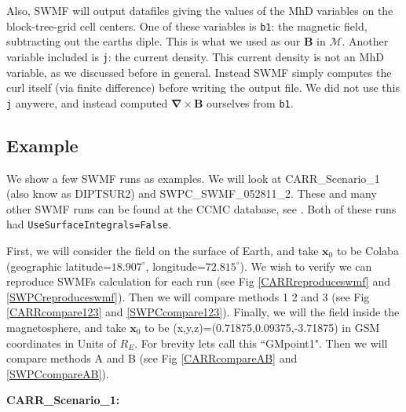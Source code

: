 \documentclass{article}
\newcommand\B{\mathbf{B}}
\newcommand\x{\mathbf{x}}
\newcommand\M{\mathcal{M}}
\newcommand\curl[1]{\boldsymbol{\nabla} \times #1}
\begin{document}
Also, SWMF will output datafiles giving the values of the MhD variables on the block-tree-grid cell centers.
One of these variables is \texttt{b1}: the magnetic field, subtracting out the earths diple.
This is what we used as our $\B$ in $\M$.
Another variable included is \texttt{j}: the current density.
This current density is not an MhD variable, as we discussed before in general.
Instead SWMF simply computes the curl itself (via finite difference) before writing the output file.
We did not use this \texttt{j} anywere, and instead computed $\curl \B$ ourselves from \texttt{b1}.

\subsection{Example}

We show a few SWMF runs as examples. We will look at CARR\_Scenario\_1 (also know as DIPTSUR2) and SWPC\_SWMF\_052811\_2.
These and many other SWMF runs can be found at the CCMC database, see \citep{ccmcdatabase}.
Both of these runs had \texttt{UseSurfaceIntegrals=False}.

First, we will consider the field on the surface of Earth, and take $\x_0$ to be Colaba (geographic latitude=$18.907^\circ$, longitude=$72.815^\circ$).
We wish to verify we can reproduce SWMFs calculation for each run (see Fig \ref{CARRreproduceswmf} and \ref{SWPCreproduceswmf}).
Then we will compare methods 1 2 and 3 (see Fig \ref{CARRcompare123} and \ref{SWPCcompare123}).
Finally, we will the field inside the magnetosphere,
and take $\x_0$ to be (x,y,z)=(0.71875,0.09375,-3.71875) in GSM coordinates in Units of $R_E$.
For brevity lets call this ``GMpoint1".
Then we will compare methods A and B (see Fig \ref{CARRcompareAB} and \ref{SWPCcompareAB}).

\textbf{CARR\_Scenario\_1:}
\end{document}

